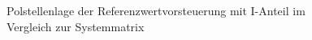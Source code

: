 \begin{figure}[H]
   \centering
   \caption[Polstellenlage der Referenzwertvorsteuerung mit I-Anteil]{Polstellenlage der Referenzwertvorsteuerung mit I-Anteil im Vergleich zur Systemmatrix}
   \label{fig:Bild12}
\end{figure}